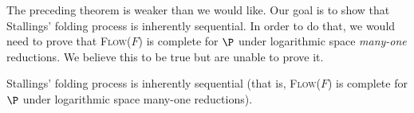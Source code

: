 \documentclass{article}
\newcommand{\Flow}{\textsc{Flow($F$)}}
\begin{document}
The preceding theorem is weaker than we would like.
Our goal is to show that Stallings' folding process is inherently sequential.
In order to do that, we would need to prove that \Flow{} is complete for $\P$ under logarithmic space \emph{many-one} reductions.
We believe this to be true but are unable to prove it.

\begin{conjecture}
  Stallings' folding process is inherently sequential (that is, \Flow{} is complete for $\P$ under logarithmic space many-one reductions).
\end{conjecture}

\printbibliography
\end{document}
